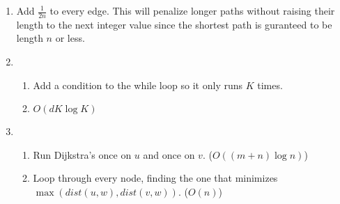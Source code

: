 \documentclass[11pt]{article}
\begin{document}
\begin{enumerate}
    \item Add $\frac{1}{2n}$ to every edge. This will penalize longer paths without raising their length to the next integer value since the shortest path is guranteed to be length $n$ or less.
    \item 
    \begin{enumerate}
        \item Add a condition to the while loop so it only runs $K$ times.
        \item $O(dK \log{K})$
    \end{enumerate}
    \item 
    \begin{enumerate}
        \item Run Dijkstra's once on $u$ and once on $v$. ($O((m + n)\log{n})$)
        \item Loop through every node, finding the one that minimizes $\max(dist(u, w), dist(v, w))$. ($O(n)$)
    \end{enumerate}
\end{enumerate}
\end{document}
